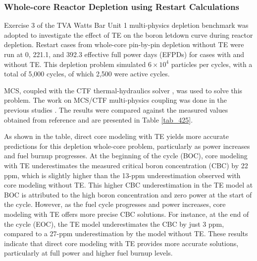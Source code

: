 \subsubsection{Whole-core Reactor Depletion using Restart Calculations}

Exercise 3 of the TVA Watts Bar Unit 1 multi-physics depletion benchmark \cite{albagami} was adopted to investigate the effect of TE on the boron letdown curve during reactor depletion. Restart cases from whole-core pin-by-pin depletion without TE were run at 0, 221.1, and 392.3 effective full power days (EFPDs) for cases with and without TE. This depletion problem simulated $6\times10^4$ particles per cycles, with a total of 5,000 cycles, of which 2,500 were active cycles.

MCS, coupled with the CTF thermal-hydraulics solver \cite{salko}, was used to solve this problem. The work on MCS/CTF multi-physics coupling was done in the previous studies \cite{yu_2017}. The results were compared against the measured values obtained from reference \cite{godfrey} and are presented in Table \ref{tab_425}.

As shown in the table, direct core modeling with TE yields more accurate predictions for this depletion whole-core problem, particularly as power increases and fuel burnup progresses. At the beginning of the cycle (BOC), core modeling with TE underestimates the measured critical boron concentration (CBC) by 22 ppm, which is slightly higher than the 13-ppm underestimation observed with core modeling without TE. This higher CBC underestimation in the TE model at BOC is attributed to the high boron concentration and zero power at the start of the cycle. However, as the fuel cycle progresses and power increases, core modeling with TE offers more precise CBC solutions. For instance, at the end of the cycle (EOC), the TE model underestimates the CBC by just 3 ppm, compared to a 27-ppm underestimation by the model without TE. These results indicate that direct core modeling with TE provides more accurate solutions, particularly at full power and higher fuel burnup levels.

